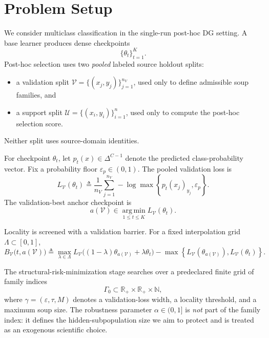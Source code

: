 \documentclass{article}
\newcommand{\RR}{\mathbb{R}}
\newcommand{\cU}{\mathcal{U}}
\newcommand{\cV}{\mathcal{V}}
\newcommand{\argmin}{\operatorname*{arg\,min}}
\newcommand{\simplex}{\Delta}
\newcommand{\braces}[1]{\left\{ #1 \right\}}
\newcommand{\1}{\mathbbm{1}}
\begin{document}
\section{Problem Setup}
\label{sec:setup}

We consider multiclass classification in the single-run post-hoc DG setting. A base learner produces dense checkpoints
\[
    \{\theta_t\}_{t=1}^{K}.
\]
Post-hoc selection uses two \emph{pooled} labeled source holdout splits:
\begin{itemize}[leftmargin=1.4em]
    \item a validation split \(\cV = \{(x_j,y_j)\}_{j=1}^{n_V}\), used only to define admissible soup families, and
    \item a support split \(\cU = \{(x_i,y_i)\}_{i=1}^{n}\), used only to compute the post-hoc selection score.
\end{itemize}
Neither split uses source-domain identities.

For checkpoint \(\theta_t\), let \(p_t(x)\in\simplex^{C-1}\) denote the predicted class-probability vector. Fix a probability floor \(\varepsilon_p\in(0,1)\). The pooled validation loss is
\begin{equation}
    L_{\cV}(\theta_t)
    \triangleq
    \frac{1}{n_V}\sum_{j=1}^{n_V}
    -\log \max\braces{p_t(x_j)_{y_j},\varepsilon_p}.
    \label{eq:val_loss}
\end{equation}
The validation-best anchor checkpoint is
\begin{equation}
    a(\cV)
    \in
    \argmin_{1\le t\le K} L_{\cV}(\theta_t).
    \label{eq:anchor}
\end{equation}

Locality is screened with a validation barrier. For a fixed interpolation grid \(\Lambda\subset[0,1]\),
\begin{equation}
    B_{\cV}\!\big(t,a(\cV)\big)
    \triangleq
    \max_{\lambda\in\Lambda}
    L_{\cV}\!\big((1-\lambda)\theta_{a(\cV)} + \lambda \theta_t\big)
    -
    \max\braces{L_{\cV}(\theta_{a(\cV)}),L_{\cV}(\theta_t)}.
    \label{eq:barrier}
\end{equation}

The structural-risk-minimization stage searches over a predeclared finite grid of family indices
\[
    \Gamma_0 \subset \RR_+ \times \RR_+ \times \mathbb{N},
\]
where \(\gamma=(\varepsilon,\tau,M)\) denotes a validation-loss width, a locality threshold, and a maximum soup size. The robustness parameter \(\alpha\in(0,1]\) is \emph{not} part of the family index: it defines the hidden-subpopulation size we aim to protect and is treated as an exogenous scientific choice.
\end{document}
